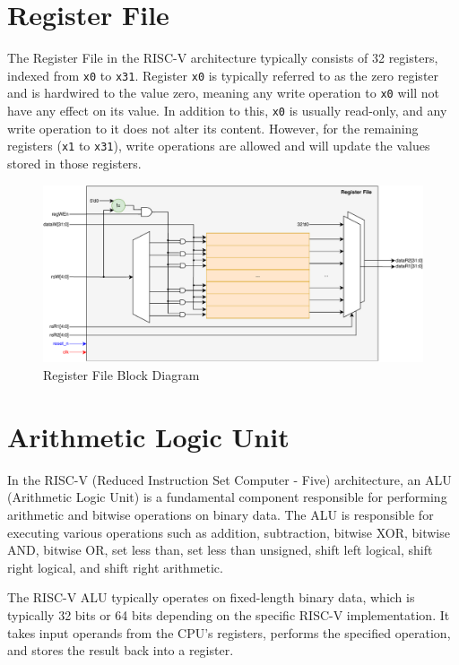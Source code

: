 \documentclass[12pt,a4paper,oneside]{book} %
\begin{document}
\section{Register File}
The Register File in the RISC-V architecture typically consists of 32 registers, indexed from \texttt{x0} to \texttt{x31}. Register \texttt{x0} is typically referred to as the zero register and is hardwired to the value zero, meaning any write operation to \texttt{x0} will not have any effect on its value. In addition to this, \texttt{x0} is usually read-only, and any write operation to it does not alter its content. However, for the remaining registers (\texttt{x1} to \texttt{x31}), write operations are allowed and will update the values stored in those registers.

\begin{figure}[H]
    \centering
    \includegraphics[width=\textwidth]{images/regfile.pdf}
    \caption{Register File Block Diagram}
\end{figure}

\section{Arithmetic Logic Unit}
In the RISC-V (Reduced Instruction Set Computer - Five) architecture, an ALU (Arithmetic Logic Unit) is a fundamental component responsible for performing arithmetic and bitwise operations on binary data. The ALU is responsible for executing various operations such as addition, subtraction, bitwise XOR, bitwise AND, bitwise OR, set less than, set less than unsigned, shift left logical, shift right logical, and shift right arithmetic.

The RISC-V ALU typically operates on fixed-length binary data, which is typically 32 bits or 64 bits depending on the specific RISC-V implementation. It takes input operands from the CPU's registers, performs the specified operation, and stores the result back into a register.
\end{document}
